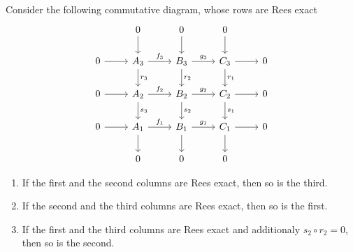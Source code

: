 \begin{corollary}[3x3 lemma]
    Consider the following commutative diagram, whose rows are Rees exact
    \[\begin{tikzcd}
        & 0 & 0 & 0 \\
        0 & {A_3} & {B_3} & {C_3} & 0 \\
        0 & {A_2} & {B_2} & {C_2} & 0 \\
        0 & {A_1} & {B_1} & {C_1} & 0 \\
        & 0 & 0 & 0
        \arrow[from=1-2, to=2-2]
        \arrow[from=1-3, to=2-3]
        \arrow[from=1-4, to=2-4]
        \arrow[from=2-1, to=2-2]
        \arrow["{f_3}", from=2-2, to=2-3]
        \arrow["{r_3}", from=2-2, to=3-2]
        \arrow["{g_3}", from=2-3, to=2-4]
        \arrow["{r_2}", from=2-3, to=3-3]
        \arrow[from=2-4, to=2-5]
        \arrow["{r_1}", from=2-4, to=3-4]
        \arrow[from=3-1, to=3-2]
        \arrow["{f_2}", from=3-2, to=3-3]
        \arrow["{s_3}", from=3-2, to=4-2]
        \arrow["{g_2}", from=3-3, to=3-4]
        \arrow["{s_2}", from=3-3, to=4-3]
        \arrow[from=3-4, to=3-5]
        \arrow["{s_1}", from=3-4, to=4-4]
        \arrow[from=4-1, to=4-2]
        \arrow["{f_1}", from=4-2, to=4-3]
        \arrow[from=4-2, to=5-2]
        \arrow["{g_1}", from=4-3, to=4-4]
        \arrow[from=4-3, to=5-3]
        \arrow[from=4-4, to=4-5]
        \arrow[from=4-4, to=5-4]
    \end{tikzcd}\]
    \begin{enumerate}
        \item If the first and the second columns are Rees exact, then so is the third.
        \item If the second and the third columns are Rees exact, then so is the first.
        \item If the first and the third columns are Rees exact and additionaly $s_2\circ r_2=0$, then so is the second.
    \end{enumerate}
\end{corollary}
